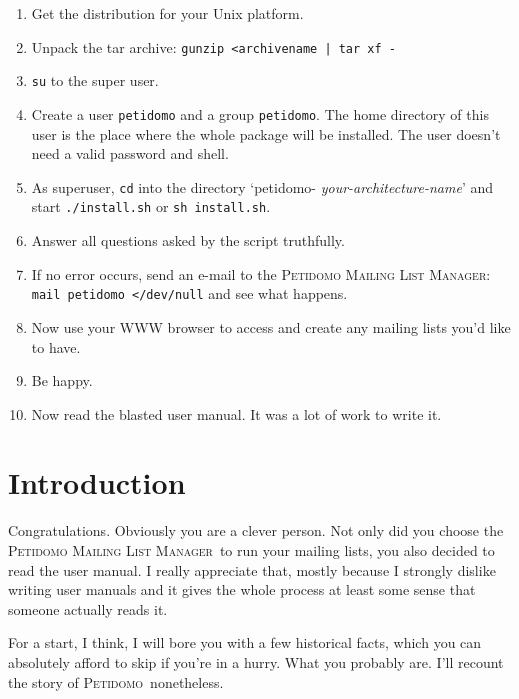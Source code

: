 \documentclass[a4paper]{report}
\newcommand{\PetidomoM}{{\scshape Peti\-domo Mail\-ing List Ma\-nager}}
\newcommand{\Petidomo}{{\scshape Peti\-domo}}
\begin{document}
\begin{enumerate}

\item Get the distribution for your Unix platform.

\item Unpack the tar archive: {\tt gunzip <archivename | tar xf -}

\item {\tt su} to the super user.

\item Create a user {\tt petidomo} and a group {\tt petidomo}. The
home directory of this user is the place where the whole package will
be installed. The user doesn't need a valid password and shell.

\item As superuser, {\tt cd} into the directory `petidomo-{\sl
your-architecture-name}' and start {\tt ./install.sh} or {\tt sh
install.sh}.

\item Answer all questions asked by the script truthfully.

\item If no error occurs, send an e-mail to the \PetidomoM: {\tt mail
petidomo </dev/null} and see what happens.

\item Now use your WWW browser to access
 and create any mailing
lists you'd like to have.

\item Be happy.

\item Now read the blasted user manual. It was a lot of work to write
it.

\end{enumerate}

\chapter{Introduction}

Congratulations. Obviously you are a clever person. Not only
did you choose the \PetidomoM\ to run your mailing lists, you also
decided to read the user manual. I really appreciate that, mostly
because I strongly dislike writing user manuals and it gives the whole
process at least some sense that someone actually reads it.

For a start, I think, I will bore you with a few historical facts,
which you can absolutely afford to skip if you're in a hurry. What you
probably are. I'll recount the story of \Petidomo\ nonetheless.
\end{document}
